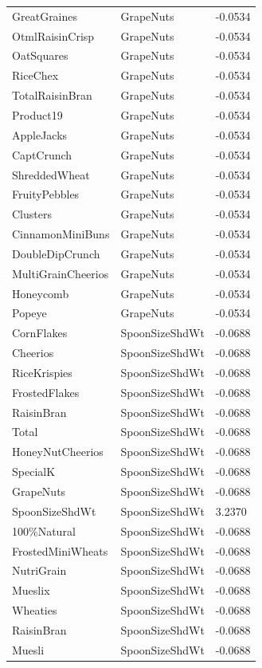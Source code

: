 \begin{table}[!htbp]
\begin{tabular}{lll}
\\
GreatGraines & GrapeNuts & -0.0534
\\
OtmlRaisinCrisp & GrapeNuts & -0.0534
\\
OatSquares & GrapeNuts & -0.0534
\\
RiceChex & GrapeNuts & -0.0534
\\
TotalRaisinBran & GrapeNuts & -0.0534
\\
Product19 & GrapeNuts & -0.0534
\\
AppleJacks & GrapeNuts & -0.0534
\\
CaptCrunch & GrapeNuts & -0.0534
\\
ShreddedWheat & GrapeNuts & -0.0534
\\
FruityPebbles & GrapeNuts & -0.0534
\\
Clusters & GrapeNuts & -0.0534
\\
CinnamonMiniBuns & GrapeNuts & -0.0534
\\
DoubleDipCrunch & GrapeNuts & -0.0534
\\
MultiGrainCheerios & GrapeNuts & -0.0534
\\
Honeycomb & GrapeNuts & -0.0534
\\
Popeye & GrapeNuts & -0.0534
\\
CornFlakes & SpoonSizeShdWt & -0.0688
\\
Cheerios & SpoonSizeShdWt & -0.0688
\\
RiceKrispies & SpoonSizeShdWt & -0.0688
\\
FrostedFlakes & SpoonSizeShdWt & -0.0688
\\
RaisinBran & SpoonSizeShdWt & -0.0688
\\
Total & SpoonSizeShdWt & -0.0688
\\
HoneyNutCheerios & SpoonSizeShdWt & -0.0688
\\
SpecialK & SpoonSizeShdWt & -0.0688
\\
GrapeNuts & SpoonSizeShdWt & -0.0688
\\
SpoonSizeShdWt & SpoonSizeShdWt & 3.2370
\\
100\%Natural & SpoonSizeShdWt & -0.0688
\\
FrostedMiniWheats & SpoonSizeShdWt & -0.0688
\\
NutriGrain & SpoonSizeShdWt & -0.0688
\\
Mueslix & SpoonSizeShdWt & -0.0688
\\
Wheaties & SpoonSizeShdWt & -0.0688
\\
RaisinBran & SpoonSizeShdWt & -0.0688
\\
Muesli & SpoonSizeShdWt & -0.0688

\end{tabular}
\end{table}

